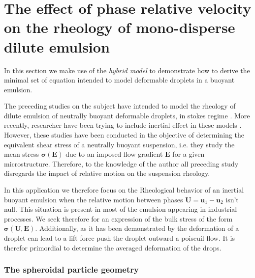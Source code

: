 \section{The effect of phase relative velocity on the rheology of mono-disperse dilute emulsion}


In this section we make use of the \textit{hybrid model} to demonstrate how to derive the minimal set of equation intended to model deformable droplets in a buoyant emulsion. 

The preceding studies on the subject have intended to model the rheology of dilute emulsion of neutrally buoyant deformable droplets, in stokes regime \citep{goddard1967nonlinear,lhuillier1987phenomenology,maffettone1998equation}.
More recently, researcher have been trying to include inertial effect in these models \citet{raja2010inertial,mwasame2018macroscopic}. 
However, these studies have been conducted in the objective of determining the equivalent shear stress of a neutrally buoyant suspension, i.e. they study the mean stress $\bm{\sigma}(\textbf{E})$ due to an imposed flow gradient $\textbf{E}$ for a given microstructure. 
Therefore, to the knowledge of the author all preceding study disregards the impact of relative motion on the suspension rheology. 

In this application we therefore focus on the Rheological behavior of an inertial buoyant emulsion when the relative motion between phases $\textbf{U} = \textbf{u}_1 - \textbf{u}_2$ isn't null. 
This situation is present in most of the emulsion appearing in industrial processes. 
We seek therefore for an expression of the bulk stress of the form $\bm{\sigma}(\textbf{U},\textbf{E})$. 
Additionally, as it has been demonstrated by \citet{haber1971dynamics} the deformation of a droplet can lead to a lift force push the droplet outward a poiseuil flow.
It is therefor primordial to determine the averaged deformation of the drops. 

\subsubsection*{The spheroidal particle geometry}

